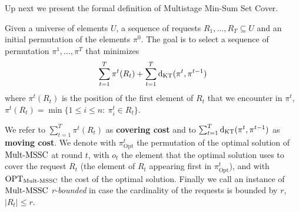\noindent Up next we present the formal definition of Multistage Min-Sum Set Cover.
\begin{definition}
Given a universe of elements $U$, a sequence of
requests $R_1,\ldots,R_T \subseteq U$ and an initial permutation of the elements $\pi^0$. 
The goal is to select a sequence of permutation $\pi^1,\ldots,\pi^T$ that minimizes 
$$\sum_{t=1}^{T} \pi^t(R_t) + \sum_{t=1}^{T} \mathrm{d}_{\mathrm{KT}} ( \pi^t, \pi^{t-1} )$$
where $\pi^t(R_t)$ is the position of the first element of $R_t$ that we encounter in $\pi^t$, $\pi^t(R_t) = \min \{1\leq i \leq n:~ \pi_i^t \in R_t\}$.
\end{definition}
\noindent We refer to $\sum_{t=1}^T\pi^t(R_t)$ as \textbf{covering cost} and to $\sum_{t=1}^T \mathrm{d}_{\mathrm{KT}}(\pi^t,\pi^{t-1})$ as \textbf{moving cost}.
We denote with $\pi_{\mathrm{Opt}}^t$ the permutation of the optimal solution of $\mathrm{Mult}\text{-}\mathrm{MSSC}$ at round $t$, with $o_t$ the element that the optimal solution uses to cover the request $R_t$ (the element of $R_t$ appearing first in $\pi_{\mathrm{Opt}}^t$), and with $\mathrm{OPT}_{\mathrm{Mult}\text{-}\mathrm{MSSC}}$ the cost of the optimal solution. Finally we call an instance of $\mathrm{Mult}\text{-}\mathrm{MSSC}$ \textit{r-bounded} in case the cardinality of the requests is bounded by $r$, $|R_t| \leq r$.